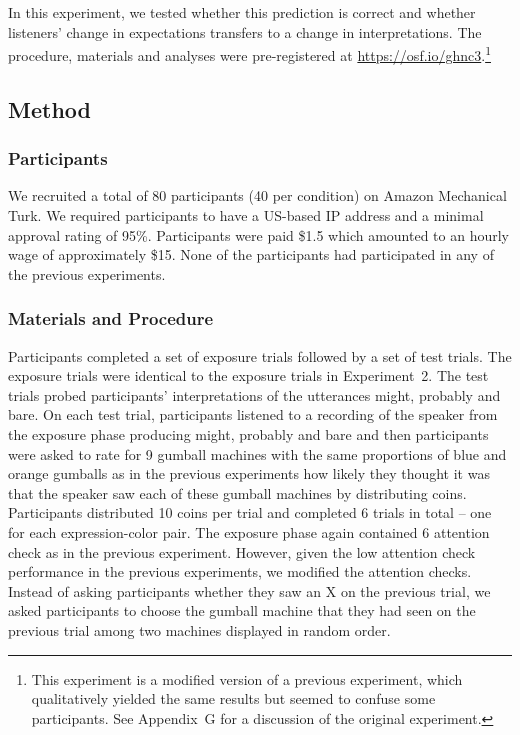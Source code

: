 In this experiment, we tested whether this prediction is correct and whether listeners' change in expectations transfers to a change in interpretations. 
The procedure, materials and analyses were pre-registered at \url{https://osf.io/ghnc3}.\footnote{This experiment is a modified version of a previous experiment, which qualitatively yielded the same results but seemed to confuse some participants. See Appendix~G for a discussion of the original experiment.}

\subsection{Method}

\subsubsection{Participants}

We recruited a total of 80 participants (40 per condition) on Amazon Mechanical Turk. We required participants to have a US-based IP address and a minimal approval rating of 95\%. Participants were paid \$1.5 which amounted to an hourly wage of approximately \$15. None of the participants had participated in any of the previous experiments. 

\subsubsection{Materials and Procedure}

Participants completed a set of exposure trials followed by a set of test trials. The exposure trials were identical to the exposure trials in Experiment~2. The test trials probed participants' interpretations of the utterances {\sc might}, {\sc probably} and {\sc bare}. On each test trial, participants listened to a recording of the speaker from the exposure phase producing {\sc might}, {\sc probably} and {\sc bare} and then participants were asked to rate for 9 gumball machines with the same proportions of blue and orange gumballs as in the previous experiments how likely they thought it was that the speaker saw each of these gumball machines by distributing coins.  Participants distributed 10 coins per trial and completed 6 trials in total  -- one for each expression-color pair. The exposure phase again contained  6 attention check as in the previous experiment. However, given the low attention check performance in the previous experiments, we modified the attention checks. Instead of asking participants whether they saw an X on the previous trial, we asked participants to choose the gumball machine that they had seen on the previous trial among two machines displayed in random order.

